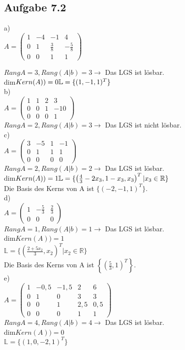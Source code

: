 \documentclass{standalone}
\begin{document}
\subsection{Aufgabe 7.2}

a)\\
$A=\left(\begin{array}{ccc|c}
	1	&-4	&-1				&4			\\
	0	&1	&\frac{3}{8}	&-\frac{5}{8}\\
	0	&0	&1				&1
\end{array}\right)$

$RangA=3, Rang(A|b)=3 \rightarrow$
Das LGS ist lösbar.\\
dim$Kern(A))=0\\
\mathbb{L}=\{(1, -1, 1)^T\}$\\


b)\\
$A=\left(\begin{array}{ccc|c}
	1	&1	&2				&3		\\
	0	&0	&1				&-10	\\
	0	&0	&0				&1
\end{array}\right)$\\

$RangA=2, Rang(A|b)=3 \rightarrow$
Das LGS ist nicht lösbar.\\


c)\\
$A=\left(\begin{array}{ccc|c}
	3	&-5	&1				&-1		\\
	0	&1	&1				&1		\\
	0	&0	&0				&0
\end{array}\right)$\\

$RangA=2, Rang(A|b)=2 \rightarrow$
Das LGS ist lösbar.\\
dim$Kern(A))=1\\
\mathbb{L}=\{\left(\frac{4}{3}-2x_3, 1-x_3, x_3\right)^T | x_3 \in \mathbb{R}\}$\\
Die Basis des Kerns von A ist $\{(-2, -1, 1)^T\}$.\\


d)\\
$A=\left(\begin{array}{cc|c}
	1	&-\frac{5}{3}	&\frac{2}{3}\\
	0	&0				&0
\end{array}\right)$\\

$RangA=1, Rang(A|b)=1 \rightarrow$
Das LGS ist lösbar.\\
dim$Kern(A))=1$\\
$\mathbb{L}=\{\left(\frac{2+5x_2}{3}, x_2\right)^T | x_2 \in \mathbb{R}\}$\\
Die Basis des Kerns von A ist $\left\{\left(\frac{5}{3}, 1\right)^T\right\}$.\\


e)\\
$A=\left(\begin{array}{cccc|c}
	1	&-0,5	&-1,5	&2		&6	\\
	0	&1		&0		&3		&3	\\
	0	&0		&1		&2,5	&0,5\\
	0	&0		&0		&1		&1
\end{array}\right)$\\

$RangA=4, Rang(A|b)=4 \rightarrow$
Das LGS ist lösbar.\\
dim$Kern(A))=0$\\
$\mathbb{L}=\{(1, 0, -2, 1)^T\}$\\
\end{document}

